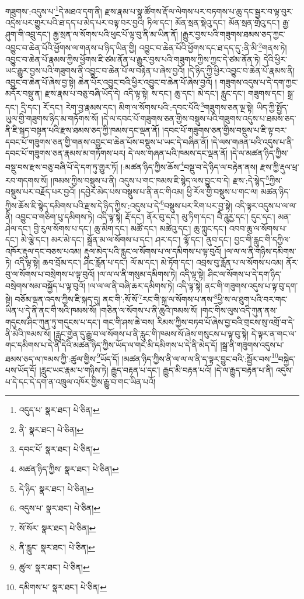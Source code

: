 གཟུགས་:འདུས་པ་\footnote{འདུད་པ་  སྣར་ཐང་།  པེ་ཅིན། }དེ་མཐའ་དག་ནི། རྫས་རྣམ་པ་སྣ་ཚོགས་རྡོ་ལ་ལེགས་པར་བཏགས་པ་ཆུ་དང་སྦྱར་བ་ལྟ་བུར་འདྲེས་པར་གྱུར་པའི་ཐ་དད་པ་མེད་པར་བལྟ་བར་བྱའི། ཏིལ་དང་། མོན་སྲན་སྡེའུ་དང་། མོན་སྲན་གྲེའུ་དང་། རྒྱ་ཤུག་གི་འབྲུ་དང་། རྒྱ་སྲན་ལ་སོགས་པའི་ཕུང་པོ་ལྟ་བུ་ནི་མ་ཡིན་ནོ། །རྒྱུར་བྱས་པའི་གཟུགས་ཐམས་ཅད་ཀྱང་འབྱུང་བ་ཆེན་པོའི་ཕྱོགས་ལ་གནས་པ་ཉིད་ཡིན་གྱི། འབྱུང་བ་ཆེན་པོའི་ཕྱོགས་དང་ཐ་དད་དུ་:ནི་མི་\footnote{ནི་  སྣར་ཐང་།  པེ་ཅིན། }གནས་ཏེ། འབྱུང་བ་ཆེན་པོ་རྣམས་ཀྱིས་ཕྱོགས་ཇི་ཙམ་ནོན་པ་རྒྱུར་བྱས་པའི་གཟུགས་ཀྱིས་ཀྱང་དེ་ཙམ་ནོན་ཏེ། དེའི་ཕྱིར་ཡང་རྒྱུར་བྱས་པའི་གཟུགས་ནི་འབྱུང་བ་ཆེན་པོ་ལ་བརྟེན་པ་ཞེས་བྱའོ། །དེ་ཉིད་ཀྱི་ཕྱིར་འབྱུང་བ་ཆེན་པོ་རྣམས་ནི། འབྱུང་བ་ཆེན་པོ་ཞེས་བྱ་སྟེ། ཆེན་པོར་འབྱུང་བའི་ཕྱིར་འབྱུང་བ་ཆེན་པོ་ཞེས་བྱའོ། །
གཟུགས་འདུས་པ་དེ་དག་ཀྱང་མདོར་བསྡུ་ན། རྫས་རྣམ་པ་བཅུ་བཞི་ཡོད་དེ། འདི་ལྟ་སྟེ། ས་དང་། ཆུ་དང་། མེ་དང་། རླུང་དང་། གཟུགས་དང་། སྒྲ་དང་། དྲི་དང་། རོ་དང་། རེག་བྱ་རྣམས་དང་། མིག་ལ་སོགས་པའི་:དབང་པོའི་\footnote{དབང་པོ་  སྣར་ཐང་།  པེ་ཅིན། }གཟུགས་ཅན་ལྔ་སྟེ། ཡིད་ཀྱི་སྤྱོད་ཡུལ་གྱི་གཟུགས་ཉིད་མ་གཏོགས་སོ། །དེ་ལ་དབང་པོ་གཟུགས་ཅན་གྱིས་བསྡུས་པའི་གཟུགས་འདུས་པ་ཐམས་ཅད་ནི་ཇི་སྐད་བསྟན་པའི་རྫས་ཐམས་ཅད་ཀྱི་ཁམས་དང་ལྡན་ནོ། །དབང་པོ་གཟུགས་ཅན་གྱིས་བསྡུས་པ་ཇི་ལྟ་བར་དབང་པོ་གཟུགས་ཅན་གྱི་གནས་འབྱུང་བ་ཆེན་པོས་བསྡུས་པ་ཡང་དེ་བཞིན་ནོ། །དེ་ལས་གཞན་པའི་འདུས་པ་ནི་དབང་པོ་གཟུགས་ཅན་རྣམས་མ་གཏོགས་པར། དེ་ལས་གཞན་པའི་ཁམས་དང་ལྡན་ནོ། །དེ་ལ་མཚན་ཉིད་ཀྱིས་བསྡུ་བས་རྫས་བཅུ་བཞི་པོ་དེ་དག་ཏུ་གྱུར་ཏོ། །:མཚན་ཉིད་ཀྱིས་ཆོས་\footnote{མཚན་ཉིད་ཀྱིས་  སྣར་ཐང་།  པེ་ཅིན། }བསྡུ་བ་དེ་ཉིད་ལ་བརྟེན་ནས། རྫས་ཀྱི་རྡུལ་ཕྲ་རབ་གདགས་སོ། །ཁམས་ཀྱིས་བསྡུས་པ་ནི། འདུས་པ་གང་ཁམས་ཇི་སྙེད་ལས་བྱུང་བ་དེ། རྫས་:དེ་སྙེད་\footnote{དེ་ཉིད་  སྣར་ཐང་།  པེ་ཅིན། }ཀྱིས་བསྡུས་པར་བརྗོད་པར་བྱའོ། །དབྱེར་མེད་པས་བསྡུས་པ་ནི་ནང་གིའམ། ཕྱི་རོལ་གྱི་བསྡུས་པ་གང་ལ། མཚན་ཉིད་ཀྱིས་ཆོས་ཇི་སྙེད་དམིགས་པའི་རྫས་དེ་ཉིད་ཀྱིས་:འདུས་པ་དེ་\footnote{འདུས་པ་  སྣར་ཐང་།  པེ་ཅིན། }བསྡུས་པར་རིག་པར་བྱ་སྟེ། འདི་ལྟར་འདུས་པ་ལ་ལ་ནི། འབྱུང་བ་གཅིག་པུ་དམིགས་ཏེ། འདི་ལྟ་སྟེ། རྡོ་དང་། ནོར་བུ་དང་། མུ་ཏིག་དང་། བཻ་ཌཱུརྱ་དང་། དུང་དང་། མན་ཤེལ་དང་། བྱི་རུལ་སོགས་པ་དང་། ཆུ་མིག་དང་། མཚོ་དང་། མཚེའུ་དང་། ཆུ་ཀླུང་དང་། འབབ་ཆུ་ལ་སོགས་པ་དང་། མེ་ལྕེ་དང་། མར་མེ་དང་། སྒྲོན་མ་ལ་སོགས་པ་དང་། ཤར་དང་། ལྷོ་དང་། ནུབ་དང་། བྱང་གི་རླུང་གི་དཀྱིལ་འཁོར་རྡུལ་དང་བཅས་པའམ། རྡུལ་མེད་པའི་རླུང་ལ་སོགས་པ་ལ་དམིགས་པ་ལྟ་བུའོ། །ལ་ལ་ལ་ནི་གཉིས་དམིགས་ཏེ། འདི་ལྟ་སྟེ། ཆབ་བྲོམ་དང་། ཤིང་རློན་པ་དང་། ལོ་མ་དང་། མེ་ཏོག་དང་། འབྲས་བུ་རློན་པ་ལ་སོགས་པའམ། ནོར་བུ་ལ་སོགས་པ་བསྲེགས་པ་ལྟ་བུའོ། །ལ་ལ་ལ་ནི་གསུམ་དམིགས་ཏེ། འདི་ལྟ་སྟེ། ཤིང་ལ་སོགས་པ་དེ་དག་ཉིད་བསྲེགས་སམ་བསྐྱོད་པ་ལྟ་བུའོ། །ལ་ལ་ལ་ནི་བཞི་ཆར་དམིགས་ཏེ། འདི་ལྟ་སྟེ། ནང་གི་གཟུགས་འདུས་པ་ལྟ་བུ་དག་སྟེ། བཅོམ་ལྡན་འདས་ཀྱིས་ཇི་སྐད་དུ། ནང་གི་:སོ་སོ་\footnote{སོ་སོར་  སྣར་ཐང་།  པེ་ཅིན། }རང་གི་སྐྲ་ལ་སོགས་པ་ནས་\footnote{ནི་རླུང་  སྣར་ཐང་།  པེ་ཅིན། }ཕྱི་ས་ལ་ཐུག་པའི་བར་གང་ཡིན་པ་དེ་ནི་ནང་གི་སའི་ཁམས་སོ། །གཅིན་ལ་སོགས་པ་ནི་ཆུའི་ཁམས་སོ། །གང་གིས་ལུས་འདི་ཀུན་ནས་གདུངས་ཤིང་ཀུན་ཏུ་གདུངས་པ་དང་། གང་གི་ཤས་ཆེ་བས། རིམས་ཀྱིས་བཏབ་པོ་ཞེས་བྱ་བའི་གྲངས་སུ་འགྲོ་བ་དེ་ནི་མེའི་ཁམས་སོ། །རླུང་གྱེན་དུ་རྒྱུ་བ་ལ་སོགས་པ་ནི་རླུང་གི་ཁམས་སོ་ཞེས་གསུངས་པ་ལྟ་བུ་སྟེ། དེ་ལྟར་ན་གང་ལ་གང་དམིགས་པ་དེ་ནི་དེའི་མཚན་ཉིད་ཀྱིས་ཡོད་ལ་གང་མི་དམིགས་པ་དེ་ནི་མེད་དོ། །སྒྲ་ནི་གཟུགས་འདུས་པ་ཐམས་ཅད་ལ་ཁམས་ཀྱི་:ཚུལ་གྱིས་\footnote{ཚུལ་  སྣར་ཐང་།  པེ་ཅིན། }ཡོད་དོ། །མཚན་ཉིད་ཀྱིས་ནི་ལ་ལ་ལ་ནི་ད་ལྟར་བྱུང་བའི་:སྦྱོར་བས་\footnote{དམིགས་པ་  སྣར་ཐང་།  པེ་ཅིན། }བསྐྱེད་པས་ཡོད་དོ། །རླུང་ཡང་རྣམ་པ་གཉིས་ཏེ། རྒྱུད་བརྟན་པ་དང་། རྒྱུད་མི་བརྟན་པའོ། །དེ་ལ་རྒྱུད་བརྟན་པ་ནི། འདུས་པ་དེ་དང་དེ་དག་ན་འཁྲུལ་འཁོར་གྱིས་རྒྱུ་བ་གང་ཡིན་པའོ། 